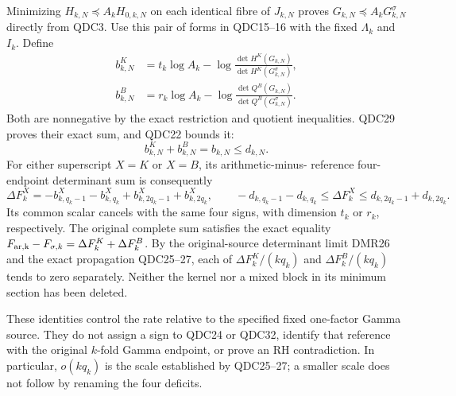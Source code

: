 \documentclass[11pt,a4paper]{article}
\begin{document}
Minimizing $H_{k,N}\preceq A_kH_{0,k,N}$ on each identical
fibre of $J_{k,N}$ proves
$G_{k,N}\preceq A_kG^\sigma_{k,N}$ directly from QDC3.
Use this pair of forms in QDC15--16 with the fixed
$\Lambda_k$ and $I_k$. Define
\[
 \begin{split}
 b^K_{k,N}
 &=t_k\log A_k-
      \log\frac{\det H^K(G_{k,N})}
                    {\det H^K(G^\sigma_{k,N})},\\
 b^B_{k,N}
 &=r_k\log A_k-
      \log\frac{\det Q^B(G_{k,N})}
                    {\det Q^B(G^\sigma_{k,N})}.
 \end{split}
 \tag{QDC30}
\]
Both are nonnegative by the exact restriction and quotient
inequalities. QDC29 proves their exact sum, and QDC22 bounds it:
\[
 b^K_{k,N}+b^B_{k,N}=b_{k,N}\le d_{k,N}.
 \tag{QDC31}
\]
For either superscript $X=K$ or $X=B$, its arithmetic-minus-
reference four-endpoint determinant sum is consequently
\[
 \Delta F^X_k
   =-b^X_{k,q_k-1}-b^X_{k,q_k}
                   +b^X_{k,2q_k-1}+b^X_{k,2q_k},
 \qquad
 -d_{k,q_k-1}-d_{k,q_k}\le\Delta F^X_k
      \le d_{k,2q_k-1}+d_{k,2q_k}.
 \tag{QDC32}
\]
Its common scalar cancels with the same four signs, with
dimension $t_k$ or $r_k$, respectively. The original complete
sum satisfies the exact equality
$F_{\rm ar,k}-F_{\sigma,k}=\Delta F^K_k+\Delta F^B_k$.
By the original-source determinant limit DMR26 and the exact propagation QDC25--27,
each of $\Delta F^K_k/(kq_k)$ and
$\Delta F^B_k/(kq_k)$ tends to zero separately.
Neither the kernel nor a mixed block in its minimum section
has been deleted.

These identities control the rate relative to the specified
fixed one-factor Gamma source. They do not assign a sign to
QDC24 or QDC32, identify that reference with the original
$k$-fold Gamma endpoint, or prove an RH contradiction.
In particular, $o(kq_k)$ is the scale established by
QDC25--27; a smaller scale does not follow by renaming
the four deficits.

\endgroup
\end{document}
